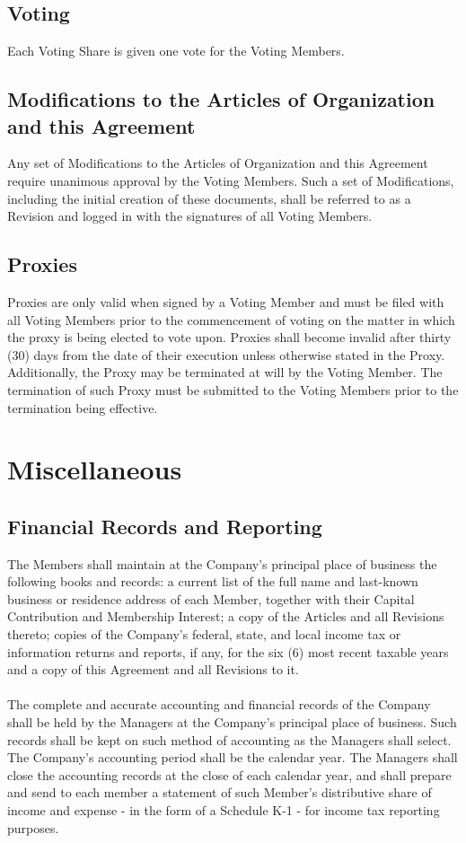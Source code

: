\documentclass[11pt]{article}
\begin{document}
\subsection{Voting}
Each Voting Share is given one vote for the Voting Members.

\subsection{Modifications to the Articles of Organization and this Agreement}
Any set of Modifications to the Articles of Organization and this Agreement require unanimous approval by the Voting Members. Such a set of Modifications, including the initial creation of these documents, shall be referred to as a Revision and logged in  with the signatures of all Voting Members.

\subsection{Proxies}
Proxies are only valid when signed by a Voting Member and must be filed with all Voting Members prior to the commencement of voting on the matter in which the proxy is being elected to vote upon. Proxies shall become invalid after thirty (30) days from the date of their execution unless otherwise stated in the Proxy. Additionally, the Proxy may be terminated at will by the Voting Member. The termination of such Proxy must be submitted to the Voting Members prior to the termination being effective.

\section{Miscellaneous}

\subsection{Financial Records and Reporting}
The Members shall maintain at the Company's principal place of business the following books and records: a current list of the full name and last-known business or residence address of each Member, together with their Capital Contribution and Membership Interest; a copy of the Articles and all Revisions thereto; copies of the Company's federal, state, and local income tax or information returns and reports, if any, for the six (6) most recent taxable years and a copy of this Agreement and all Revisions to it.\\\\
The complete and accurate accounting and financial records of the Company shall be held by the Managers at the Company's principal place of business. Such records shall be kept on such method of accounting as the Managers shall select. The Company's accounting period shall be the calendar year. The Managers shall close the accounting records at the close of each calendar year, and shall prepare and send to each member a statement of such Member's distributive share of income and expense - in the form of a Schedule K-1 - for income tax reporting purposes.
\end{document}
